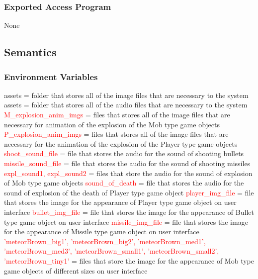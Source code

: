 \documentclass[12pt, titlepage]{article}
\begin{document}
\subsubsection*{Exported Access Program}
None

\subsection*{Semantics}
\subsubsection*{Environment Variables}
assets = folder that stores all of the image files that are necessary to the system 
\newline
assets = folder that stores all of the audio files that are necessary to the system 
\newline
\textcolor{red}{M\_explosion\_anim\_imgs} = files that stores all of the image files that are necessary for animation of the explosion of the Mob type game objects
\newline
\textcolor{red}{P\_explosion\_anim\_imgs} = files that stores all of the image files that are necessary for the animation of  the explosion of the Player type game objects
\newline
\textcolor{red}{shoot\_sound\_file} = file that stores the audio for the sound of shooting bullets 
\newline
\textcolor{red}{missile\_sound\_file} = file that stores the audio for the sound of shooting missiles
\newline
\textcolor{red}{expl\_sound1, expl\_sound2} = files that store the audio for the sound of explosion of Mob type game objects
\newline
\textcolor{red}{sound\_of\_death} = file that stores the audio for the sound of explosion of the death of Player type game object 
\newline
\textcolor{red}{player\_img\_file} = file that stores the image for the appearance of Player type game object on user interface 
\newline
\textcolor{red}{bullet\_img\_file} = file that stores the image for the appearance of Bullet type game object on user interface
\newline
\textcolor{red}{missile\_img\_file} =  file that stores the image for the appearance of Missile type game object on user interface
\newline
\textcolor{red}{'meteorBrown\_big1',
'meteorBrown\_big2', 'meteorBrown\_med1', 
    'meteorBrown\_med3',
    'meteorBrown\_small1',
    'meteorBrown\_small2',
    'meteorBrown\_tiny1'} =  files that store the image for the appearance of Mob type game objects of different sizes on user interface
\end{document}
